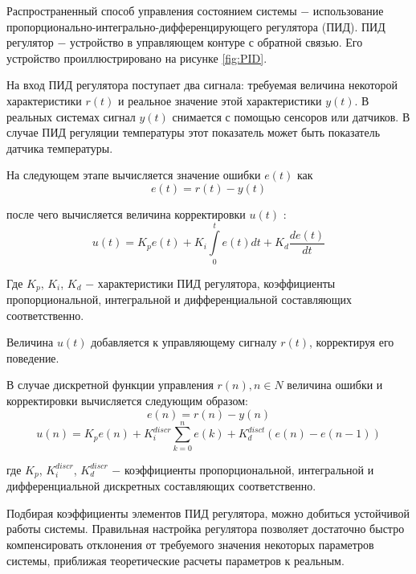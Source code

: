 \documentclass[oneside,final,14pt]{extreport}
\begin{document}
Распространенный способ управления состоянием системы $-$  использование пропорционально-интегрально-дифференцирующего регулятора (ПИД). ПИД регулятор $-$ устройство в управляющем контуре с обратной связью. Его устройство проиллюстрировано  на рисунке \ref{fig:PID}.


\begin{figure}[H]
\end{figure}

На вход ПИД регулятора поступает два сигнала: требуемая величина некоторой характеристики $r(t)$ и реальное значение этой характеристики $y(t)$. В реальных системах сигнал  $y(t)$ снимается с помощью сенсоров или датчиков. В случае ПИД регуляции температуры этот показатель может быть показатель датчика температуры. 

На следующем этапе вычисляется значение ошибки $e(t)$  как 
\begin{equation}
e(t)
=
r(t) - y(t)
\end{equation}

после чего вычисляется величина корректировки $u(t)$ :
\begin{equation}
u(t)
=
K_{p} e(t)
+
K_{i} \int\limits_{0}^{t} e(t) dt
+
K_{d} 
\frac{d e(t)}{dt}
\end{equation} 

Где $K_p$, $K_i$, $K_d$ $-$ характеристики ПИД регулятора, коэффициенты  пропорциональной, интегральной и дифференциальной составляющих соответственно.

Величина $u(t)$ добавляется к управляющему сигналу $r(t)$, корректируя его поведение. 

В случае дискретной функции управления $r(n), n \in N$ величина ошибки и корректировки вычисляется следующим образом:
\begin{equation}
\label{Equation:discretError}
e(n) 
=
r(n)
-
y(n)
\end{equation}
\begin{equation}
u(n)
=
K_p e(n)
+
K_i^{discr} \sum\limits_{k=0}^n e(k)
+
K_d^{disct} (e(n) - e(n-1)) 
\end{equation}

где $K_p$, $K_i^{discr}$, $K_d^{discr}$ $-$ коэффициенты  пропорциональной, интегральной и дифференциальной дискретных составляющих соответственно.

Подбирая коэффициенты элементов ПИД регулятора, можно добиться устойчивой работы системы. Правильная настройка регулятора позволяет достаточно быстро компенсировать  отклонения от требуемого значения некоторых параметров системы, приближая теоретические расчеты  параметров к реальным. 
\end{document}
